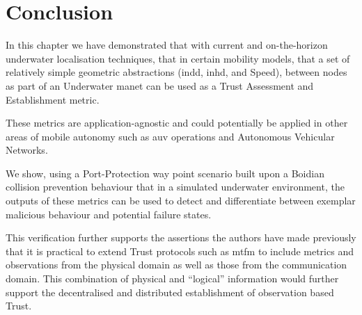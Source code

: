\section{Conclusion}
In this chapter we have demonstrated that with current and on-the-horizon underwater localisation techniques, that in certain mobility models, that a set of relatively simple geometric abstractions (\gls{indd}, \gls{inhd}, and Speed), between nodes as part of an Underwater \gls{manet} can be used as a Trust Assessment and Establishment metric.

These metrics are application-agnostic and could potentially be applied in other areas of mobile autonomy such as \gls{auv} operations and Autonomous Vehicular Networks.

We show, using a Port-Protection way point scenario built upon a Boidian collision prevention behaviour that in a simulated underwater environment, the outputs of these metrics can be used to detect and differentiate between exemplar malicious behaviour and potential failure states.

This verification further supports the assertions the authors have made previously that it is practical to extend Trust protocols such as \gls{mtfm} \cite{Guo2012} to include metrics and observations from the physical domain as well as those from the communication domain\cite{Bolster2014}.
This combination of physical and ``logical'' information would further support the decentralised and distributed establishment of observation based Trust.

